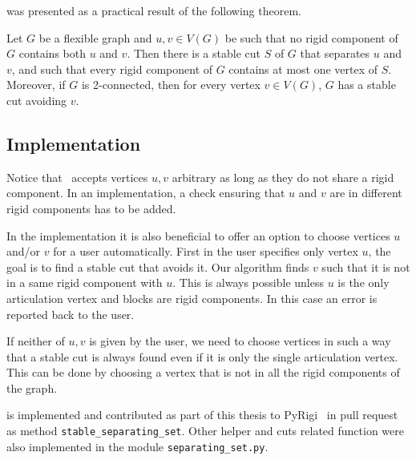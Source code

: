 was presented as a practical result of the following theorem.
%
\begin{theorem}
	Let \( G \) be a flexible graph and \( u, v \in V (G) \) be such that no rigid component of \( G \)
	contains both \( u \) and \( v \). Then there is a stable cut \( S \) of \( G \) that separates \( u \) and \( v \), and such that
	every rigid component of \( G \) contains at most one vertex of \( S \). Moreover, if \( G \) is 2-connected,
	then for every vertex \( v \in V(G) \), \( G \) has a stable cut avoiding \( v \).
\end{theorem}
%

\subsection{Implementation}%
\label{sec:stable_cuts_implementation}

Notice that~
accepts vertices \( u, v \) arbitrary as long as they do not share a rigid component.
In an implementation, a check ensuring that \( u \) and \( v \)
are in different rigid components has to be added.

In the implementation it is also beneficial to offer an option to choose
vertices \( u \) and/or \(  v \) for a user automatically.
First in the user specifies only vertex \( u \), the goal is to find a stable cut
that avoids it. Our algorithm finds \( v \)
such that it is not in a same rigid component with \( u \).
This is always possible unless \( u \) is the only articulation vertex
and blocks are rigid components. In this case an error is reported back to the user.

If neither of \( u, v \) is given by the user,
we need to choose vertices in such a way
that a stable cut is always found even if it is only the single articulation vertex.
This can be done by choosing a vertex that is not in all the rigid components of the graph.

%
is implemented and contributed as part of this thesis
to PyRigi~\cite{pyrigi} in pull request~\cite{pyrigi_pr_stable_cuts}
as method \texttt{stable\_separating\_set}.
Other helper and cuts related function
were also implemented in the module \texttt{separating\_set.py}.

